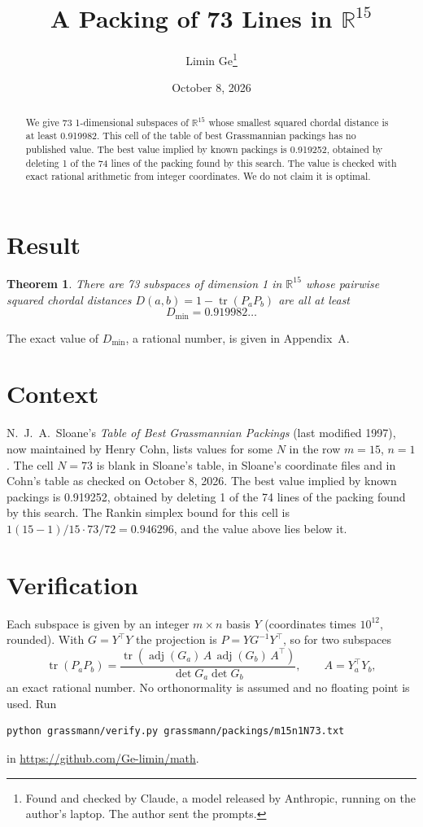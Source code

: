 \documentclass[11pt,a4paper]{article}
\title{A Packing of 73 Lines in $\mathbb{R}^{15}$}
\author{Limin Ge\thanks{Found and checked by Claude, a model released by Anthropic, running on the author's laptop. The author sent the prompts.}}
\date{October 8, 2026}
\newtheorem*{theorem}{Theorem}
\begin{document}
\maketitle
\begin{abstract}
We give 73 1-dimensional subspaces of $\mathbb{R}^{15}$ whose smallest squared chordal distance is at least 0.919982. This cell of the table of best Grassmannian packings has no published value. The best value implied by known packings is 0.919252, obtained by deleting 1 of the 74 lines of the packing found by this search. The value is checked with exact rational arithmetic from integer coordinates. We do not claim it is optimal.
\end{abstract}

\section{Result}
\begin{theorem}
There are 73 subspaces of dimension 1 in $\mathbb{R}^{15}$ whose pairwise squared chordal distances $D(a,b) = 1 - \operatorname{tr}(P_aP_b)$ are all at least
\[ D_{\min} = 0.919982\ldots \]
\end{theorem}
The exact value of $D_{\min}$, a rational number, is given in Appendix~A.


\section{Context}
N.~J.~A.~Sloane's \emph{Table of Best Grassmannian Packings} (last modified 1997), now maintained by Henry Cohn, lists values for some $N$ in the row $m=15$, $n=1$. The cell $N=73$ is blank in Sloane's table, in Sloane's coordinate files and in Cohn's table as checked on October 8, 2026. The best value implied by known packings is 0.919252, obtained by deleting 1 of the 74 lines of the packing found by this search. The Rankin simplex bound for this cell is $1(15-1)/15\cdot 73/72 = 0.946296$, and the value above lies below it.


\section{Verification}
Each subspace is given by an integer $m\times n$ basis $Y$ (coordinates times $10^{12}$, rounded). With $G=Y^\top Y$ the projection is $P=YG^{-1}Y^\top$, so for two subspaces
\[ \operatorname{tr}(P_aP_b)=\frac{\operatorname{tr}(\operatorname{adj}(G_a)\,A\,\operatorname{adj}(G_b)\,A^\top)}{\det G_a\det G_b},\qquad A=Y_a^\top Y_b, \]
an exact rational number. No orthonormality is assumed and no floating point is used. Run
\begin{verbatim}
python grassmann/verify.py grassmann/packings/m15n1N73.txt
\end{verbatim}
in \url{https://github.com/Ge-limin/math}.
\end{document}
